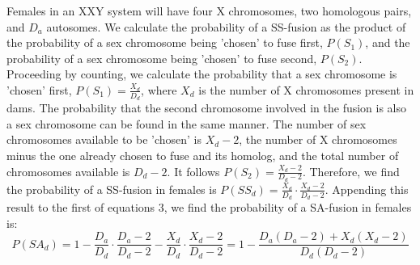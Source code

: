 \documentclass[12pt]{article}
\begin{document}
Females in an XXY system will have four X chromosomes, two homologous pairs, and $D_a$ autosomes. 
We calculate the probability of a SS-fusion as the product of the probability of a sex chromosome being 'chosen' to fuse first, $P(S_1)$, and the probability of a sex chromosome being 'chosen' to fuse second, $P(S_2)$. 
Proceeding by counting, we calculate the probability that a sex chromosome is 'chosen' first,
$P(S_1) = \frac{X_d}{D_d} $, where $X_d $ is the number of X chromosomes present in dams. 
The probability that the second chromosome involved in the fusion is also a sex chromosome can be found in the same manner. 
The number of sex chromosomes available to be 'chosen' is $X_d - 2 $, the number of X chromosomes minus the one already chosen to fuse and its homolog, and the total number of chromosomes available is $D_d - 2$. 
It follows $P(S_2) = \frac{X_d-2}{D_d-2}$. 
Therefore, we find the probability of a SS-fusion in females is  $P(SS_d) = \frac{X_d}{D_d} \cdot \frac{X_d-2}{D_d-2}$.
Appending this result to the first of equations 3, we find the probability of a SA-fusion in females is:
    \begin{equation}
        P(SA_d) = 1 - \frac{D_a}{D_d} \cdot \frac{D_a - 2}{D_d - 2} -  \frac{X_d}{D_d} \cdot \frac{X_d-2}{D_d-2} = 1 - \frac{D_a(D_a-2) + X_d(X_d-2)}{D_d(D_d-2)}
    \end{equation}
\end{document}
